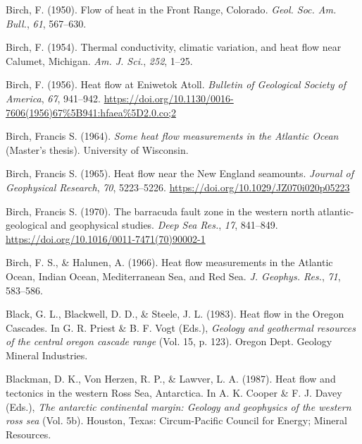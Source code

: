\documentclass[draft,linenumbers]{agujournal2018}
\begin{document}
\leavevmode{}%
Birch, F. (1950). Flow of heat in the {Front Range, Colorado}.
\emph{Geol. Soc. Am. Bull.}, \emph{61}, 567--630.

\leavevmode{}%
Birch, F. (1954). Thermal conductivity, climatic variation, and heat
flow near {Calumet, Michigan}. \emph{Am. J. Sci.}, \emph{252}, 1--25.

\leavevmode{}%
Birch, F. (1956). Heat flow at {Eniwetok Atoll}. \emph{Bulletin of
Geological Society of America}, \emph{67}, 941--942.
\url{https://doi.org/10.1130/0016-7606(1956)67\%5B941:hfaea\%5D2.0.co;2}

\leavevmode{}%
Birch, Francis S. (1964). \emph{Some heat flow measurements in the
{Atlantic Ocean}} (Master's thesis). University of Wisconsin.

\leavevmode{}%
Birch, Francis S. (1965). Heat flow near the {New England} seamounts.
\emph{Journal of Geophysical Research}, \emph{70}, 5223--5226.
\url{https://doi.org/10.1029/JZ070i020p05223}

\leavevmode{}%
Birch, Francis S. (1970). The barracuda fault zone in the western north
atlantic- geological and geophysical studies. \emph{Deep Sea Res.},
\emph{17}, 841--849. \url{https://doi.org/10.1016/0011-7471(70)90002-1}

\leavevmode{}%
Birch, F. S., \& Halunen, A. (1966). Heat flow measurements in the
{Atlantic Ocean, Indian Ocean, Mediterranean Sea, and Red Sea}. \emph{J.
Geophys. Res.}, \emph{71}, 583--586.

\leavevmode{}%
Black, G. L., Blackwell, D. D., \& Steele, J. L. (1983). Heat flow in
the {Oregon Cascades}. In G. R. Priest \& B. F. Vogt (Eds.),
\emph{Geology and geothermal resources of the central oregon cascade
range} (Vol. 15, p. 123). Oregon Dept. Geology Mineral Industries.

\leavevmode{}%
Blackman, D. K., Von Herzen, R. P., \& Lawver, L. A. (1987). Heat flow
and tectonics in the western {Ross Sea}, {Antarctica}. In A. K. Cooper
\& F. J. Davey (Eds.), \emph{The antarctic continental margin: Geology
and geophysics of the western ross sea} (Vol. 5b). Houston, Texas:
Circum-Pacific Council for Energy; Mineral Resources.
\end{document}
